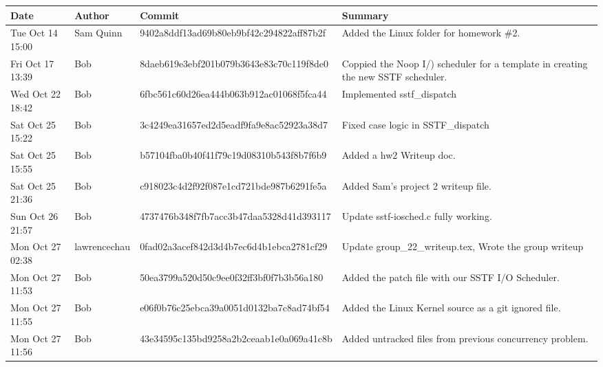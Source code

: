\documentclass[letterpaper,10pt,notitlepage,fleqn]{article}
\begin{document}
\begin{center}
    \begin{tabular}{| p{3cm} | l | l | p{5cm} |}
        \hline
        Date & Author & Commit & Summary \\ \hline
        Tue Oct 14 15:00 & Sam Quinn & 9402a8ddf13ad69b80eb9bf42c294822aff87b2f & Added the Linux folder for homework \#2.
        \\ \hline
        Fri Oct 17 13:39 & Bob & 8daeb619e3ebf201b079b3643e83c70c119f8de0 & Coppied the Noop I/) scheduler for a template in creating the new SSTF scheduler.
        \\ \hline
        Wed Oct 22 18:42 & Bob & 6fbc561c60d26ea444b063b912ac01068f5fca44 & Implemented sstf\_dispatch
        \\ \hline
        Sat Oct 25 15:22 & Bob & 3c4249ea31657ed2d5eadf9fa9e8ac52923a38d7 & Fixed case logic in SSTF\_dispatch
        \\ \hline
        Sat Oct 25 15:55 & Bob & b57104fba0b40f41f79c19d08310b543f8b7f6b9 & Added a hw2 Writeup doc.
        \\ \hline
        Sat Oct 25 21:36 & Bob & c918023c4d2f92f087e1cd721bde987b6291fe5a & Added Sam's project 2 writeup file.
        \\ \hline
        Sun Oct 26 21:57 & Bob & 4737476b348f7fb7acc3b47daa5328d41d393117 & Update sstf-iosched.c fully working.
        \\ \hline
        Mon Oct 27 02:38 & lawrencechau & 0fad02a3acef842d3d4b7ec6d4b1ebca2781cf29 & Update group\_22\_writeup.tex, Wrote the group writeup
        \\ \hline
        Mon Oct 27 11:53 & Bob & 50ea3799a520d50c9ee0f32ff3bf0f7b3b56a180 & Added the patch file with our SSTF I/O Scheduler.
        \\ \hline
        Mon Oct 27 11:55 & Bob & e06f0b76c25ebca39a0051d0132ba7c8ad74bf54 & Added the Linux Kernel source as a git ignored file.
        \\ \hline
        Mon Oct 27 11:56 & Bob & 43e34595c135bd9258a2b2ceaab1e0a069a41c8b & Added untracked files from previous concurrency problem.
        \\ \hline
    \end{tabular}
\end{center}
\end{document}
